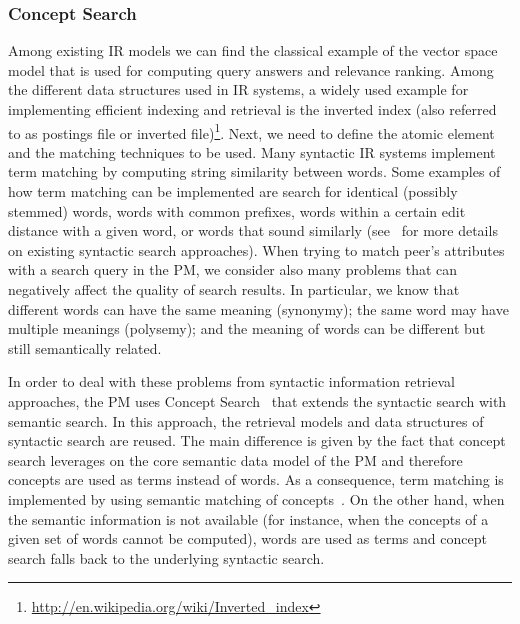 \subsubsection{Concept Search}
\label{subsec:concept_search}
Among existing IR models we can find the classical example of the vector space model that is used for computing query answers and relevance ranking. Among the different data structures used in IR systems, a widely used example for implementing efficient indexing and retrieval is the inverted index (also referred to as postings file or inverted file)\footnote{\url{http://en.wikipedia.org/wiki/Inverted_index}}. Next, we need to define the atomic element and the matching techniques to be used. Many syntactic IR systems implement term matching by computing string similarity between words. Some examples of how term matching can be implemented are search for identical (possibly stemmed) words, words with common prefixes, words within a certain edit distance with a given word, or words that sound similarly (see~\cite{Manning:2008:IIR:1394399} for more details on existing syntactic search approaches). When trying to match peer's attributes with a search query in the PM, we consider also many problems that can negatively affect the quality of search results. In particular, we know that different words can have the same meaning (synonymy); the same word may have multiple meanings (polysemy); and the meaning of words can be different but still semantically related.

In order to deal with these problems from syntactic information retrieval approaches, the PM uses Concept Search~\cite{Giunchiglia:2009fk} that extends the syntactic search with semantic search. In this approach, the retrieval models and data structures of syntactic search are reused. The main difference is given by the fact that concept search leverages on the core semantic data model of the PM and therefore concepts are used as terms instead of words. As a consequence, term matching is implemented by using semantic matching of concepts~\cite{Giunchiglia:2007ve}. On the other hand, when the semantic information is not available (for instance, when the concepts of a given set of words cannot be computed), words are used as terms and concept search falls back to the underlying syntactic search.

